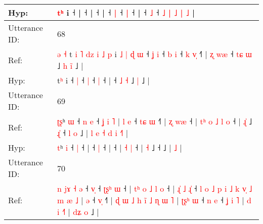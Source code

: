 \documentclass[10pt]{article}
\DeclareRobustCommand{\hl}[1]{{\textcolor{red}{#1}}}
\begin{document}
\begin{longtable}{ll}
 \\
Hyp: & \hl{}\hl{}\hl{}\hl{}\hl{}\hl{}\hl{}\hl{}\hl{}\hl{}\hl{t}\hl{ʰ} i ˧ |\hl{}\hl{}\hl{}\hl{}\hl{}\hl{}\hl{}\hl{}\hl{}\hl{}\hl{}\hl{}\hl{}\hl{}\hl{}\hl{}\hl{}\hl{}\hl{}\hl{}\hl{}\hl{}\hl{} ˧\hl{} |\hl{}\hl{}\hl{}\hl{}\hl{}\hl{}\hl{}\hl{} ˧\hl{}\hl{}\hl{}\hl{}\hl{}\hl{}\hl{}\hl{}\hl{}\hl{}\hl{}\hl{} |\hl{}\hl{}\hl{}\hl{} ˧\hl{}\hl{} \hl{|} ˧\hl{}\hl{} \hl{|} ˧ |\hl{}\hl{}\hl{}\hl{} ˧\hl{}\hl{} \hl{˩} ˧\hl{}\hl{} \hl{˩} \hl{|} \hl{˩} \hl{}\hl{|} \hl{}\hl{˩} |
 \\
\midrule
Utterance ID: & 68 \\
Ref: & \hl{ə}\hl{ }\hl{˧}\hl{ }t\hl{ }\hl{i}\hl{ }\hl{˥}\hl{ }\hl{d}\hl{z}\hl{ }\hl{i}\hl{ }\hl{˩}\hl{ }\hl{p} i\hl{ }\hl{˩}\hl{ }\hl{|}\hl{ }\hl{ɖ}\hl{ }\hl{ɯ} ˧\hl{ }\hl{ʝ} \hl{i} ˧\hl{ }\hl{b} \hl{i} ˧\hl{ }\hl{k} \hl{v}\hl{̩} ˧\hl{˥} |\hl{ }\hl{ʐ}\hl{ }\hl{w}\hl{æ} ˧ \hl{t}\hl{ɕ} \hl{ɯ} ˩\hl{ }\hl{h} \hl{i}\hl{̃} ˩ |
 \\
Hyp: & \hl{}\hl{}\hl{}\hl{}t\hl{}\hl{}\hl{}\hl{}\hl{}\hl{}\hl{}\hl{}\hl{}\hl{}\hl{}\hl{}\hl{ʰ} i\hl{}\hl{}\hl{}\hl{}\hl{}\hl{}\hl{}\hl{} ˧\hl{}\hl{} \hl{|} ˧\hl{}\hl{} \hl{|} ˧\hl{}\hl{} \hl{}\hl{|} ˧\hl{} |\hl{}\hl{}\hl{}\hl{}\hl{} ˧ \hl{}\hl{˩} \hl{˧} ˩\hl{}\hl{} \hl{}\hl{|} ˩ |
 \\
\midrule
Utterance ID: & 69 \\
Ref: & \hl{ʈ}\hl{ʂ}ʰ \hl{ɯ} ˧\hl{ }\hl{n} \hl{e} ˧\hl{ }\hl{ʝ}\hl{ }\hl{i}\hl{ }\hl{˥} |\hl{ }\hl{l}\hl{ }\hl{e} ˧\hl{ }\hl{t}\hl{ɕ} \hl{ɯ} ˧\hl{˥} |\hl{ }\hl{ʐ}\hl{ }\hl{w}\hl{æ} ˧ |\hl{ }\hl{t}\hl{ʰ}\hl{ }\hl{o}\hl{ }\hl{˩} \hl{l} \hl{o} ˧ | \hl{ɻ}\hl{̍} ˩\hl{ }\hl{ɻ}\hl{̍} ˧\hl{ }\hl{l}\hl{ }\hl{o} ˩ |\hl{ }\hl{l}\hl{ }\hl{e}\hl{ }\hl{˧}\hl{ }\hl{d}\hl{ }\hl{i} \hl{˧}\hl{˥} |
 \\
Hyp: & \hl{}\hl{t}ʰ \hl{i} ˧\hl{}\hl{} \hl{|} ˧\hl{}\hl{}\hl{}\hl{}\hl{}\hl{} |\hl{}\hl{}\hl{}\hl{} ˧\hl{}\hl{}\hl{} \hl{|} ˧\hl{} |\hl{}\hl{}\hl{}\hl{}\hl{} ˧ |\hl{}\hl{}\hl{}\hl{}\hl{}\hl{}\hl{} \hl{˧} \hl{|} ˧ | \hl{}\hl{˧} ˩\hl{}\hl{}\hl{} ˧\hl{}\hl{}\hl{}\hl{} ˩ |\hl{}\hl{}\hl{}\hl{}\hl{}\hl{}\hl{}\hl{}\hl{}\hl{} \hl{}\hl{˩} |
 \\
\midrule
Utterance ID: & 70 \\
Ref: & \hl{n}\hl{ }\hl{j}\hl{ɤ}\hl{ }\hl{˧} \hl{ə} ˧ \hl{v}\hl{̩} ˧\hl{ }\hl{ʈ}\hl{ʂ}\hl{ʰ} \hl{ɯ} ˧ |\hl{ }\hl{t}\hl{ʰ}\hl{ }\hl{o}\hl{ }\hl{˩}\hl{ }\hl{l}\hl{ }\hl{o} ˧ |\hl{ }\hl{ɻ}\hl{̍}\hl{ }\hl{˩}\hl{ }\hl{ɻ}\hl{̍} ˧\hl{ }\hl{l}\hl{ }\hl{o}\hl{ }\hl{˩}\hl{ }\hl{p}\hl{ }\hl{i}\hl{ }\hl{˩}\hl{ }\hl{k}\hl{ }\hl{v}\hl{̩}\hl{ }\hl{˩}\hl{ }\hl{m}\hl{ }\hl{æ}\hl{ }\hl{˩} |\hl{ }\hl{ə} ˧ \hl{v}\hl{̩} ˧\hl{˥} |\hl{ }\hl{ɖ}\hl{ }\hl{ɯ}\hl{ }\hl{˩}\hl{ }\hl{h}\hl{ }\hl{i}\hl{̃}\hl{ }\hl{˩}\hl{ }\hl{ɳ}\hl{ }\hl{ɯ} \hl{˥} | \hl{ʈ}\hl{ʂ}\hl{ʰ} \hl{ɯ} ˧\hl{ }\hl{n} \hl{e} ˧ \hl{ʝ} \hl{i} \hl{˥} |\hl{ }\hl{d}\hl{ }\hl{i} \hl{˧}\hl{˥} |\hl{ }\hl{d}\hl{ʑ}\hl{ }\hl{o} ˩ |

\end{longtable}
\end{document}
